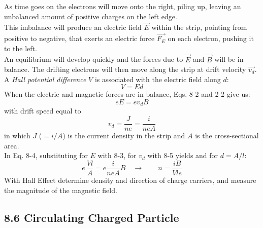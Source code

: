 \documentclass[12pt, a4paper]{article}
\begin{document}
		As time goes on the electrons will move onto the right, piling up, leaving an unbalanced amount of positive charges on the left edge. \\ This imbalance will produce an electric field $\vec{E}$ within the strip, pointing from positive to negative, that exerts an electric force $\vec{F_E}$ on each electron, pushing it to the left. \\ 
		An equilibrium will develop quickly and the forces due to $\vec{E}$ and $\vec{B}$ will be in balance. The drifting electrons will then move along the strip at drift velocity $\vec{v_d}$. \\ 
		A \textit{Hall potential difference} $V$ is associated with the electric field along $d$:
		\[
			V = Ed
			\tag{8-3}
		\]
		When the electric and magnetic forces are in balance, Eqs. 8-2 and 2-2 give us:
		\[
			e E = e v_d B
			\tag{8-4}
		\]
		with drift speed equal to
		\[
			v_d = \frac{J}{ne} = \frac{i}{n e A}
			\tag{8-5}
		\]
		in which $J$ ($= i/A$) is the current density in the strip and $A$ is the cross-sectional area. \\
		In Eq. 8-4, substituting for $E$ with 8-3, for $v_d$ with 8-5 yields and for $d = A / l$:
		\[
			e \, \frac{Vl}{A} = e \frac{i}{neA} B \quad \rightarrow \quad \quad
			n = \frac{iB}{Vle}
			\tag{8-6}
		\]
		With Hall Effect determine density and direction of charge carriers, and measure the magnitude of the magnetic field.
		
		
		
		\subsection*{8.6 Circulating Charged Particle}
		
		
			
		
		
	
	
	

	
\end{document}
